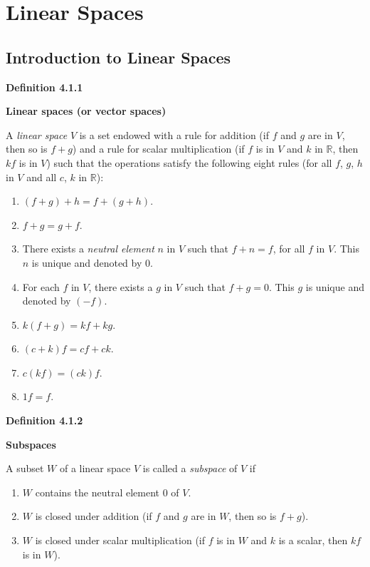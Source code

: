 \section{Linear Spaces}

\subsection{Introduction to Linear Spaces}
\textbf{Definition 4.1.1}\\
\par\noindent\textbf{Linear spaces (or vector spaces)}
\par\noindent A \textit{linear space} $V$ is a set endowed with a rule for addition (if $f$ and $g$ are in $V$, then so is $f+g$) and a rule for scalar multiplication (if $f$ is in $V$ and $k$ in $\mathbb{R}$, then $kf$ is in $V$) such that the operations satisfy the following eight rules (for all $f$, $g$, $h$ in $V$ and all $c$, $k$ in $\mathbb{R}$):
\renewcommand{\labelenumi}{\textbf{\arabic{enumi}}.}
\begin{enumerate}
\item $(f+g)+h=f+(g+h)$.
\item $f+g=g+f$.
\item There exists a \textit{neutral element} $n$ in $V$ such that $f+n=f$, for all $f$ in $V$. This $n$ is unique and denoted by $0$.
\item For each $f$ in $V$, there exists a $g$ in $V$ such that $f+g=0$. This $g$ is unique and denoted by $(-f)$.
\item $k(f+g)=kf+kg$.
\item $(c+k)f=cf+ck$.
\item $c(kf)=(ck)f$.
\item $1f=f$.
\end{enumerate}
\textbf{Definition 4.1.2}\\
\par\noindent\textbf{Subspaces}
\par\noindent A subset $W$ of a linear space $V$ is called a \textit{subspace} of $V$ if
\renewcommand{\labelenumi}{\textbf{\alph{enumi}.}}
\begin{enumerate}
\item $W$ contains the neutral element $0$ of $V$.
\item $W$ is closed under addition (if $f$ and $g$ are in $W$, then so is $f+g$).
\item $W$ is closed under scalar multiplication (if $f$ is in $W$ and $k$ is a scalar, then $kf$ is in $W$).
\end{enumerate}
